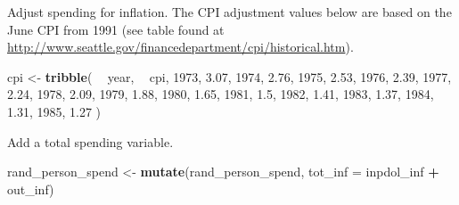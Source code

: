 \documentclass[]{book}
\newenvironment{Shaded}{\begin{snugshade}}{\end{snugshade}}
\newcommand{\DataTypeTok}[1]{\textcolor[rgb]{0.13,0.29,0.53}{#1}}
\newcommand{\DecValTok}[1]{\textcolor[rgb]{0.00,0.00,0.81}{#1}}
\newcommand{\FloatTok}[1]{\textcolor[rgb]{0.00,0.00,0.81}{#1}}
\newcommand{\KeywordTok}[1]{\textcolor[rgb]{0.13,0.29,0.53}{\textbf{#1}}}
\newcommand{\NormalTok}[1]{#1}
\newcommand{\OperatorTok}[1]{\textcolor[rgb]{0.81,0.36,0.00}{\textbf{#1}}}
\newcommand{\StringTok}[1]{\textcolor[rgb]{0.31,0.60,0.02}{#1}}
\theoremstyle{definition}
\theoremstyle{definition}
\theoremstyle{definition}
\theoremstyle{remark}
\begin{document}
Adjust spending for inflation. The CPI adjustment values below are based
on the June CPI from 1991 (see table found at
\url{http://www.seattle.gov/financedepartment/cpi/historical.htm}).

\begin{Shaded}
\begin{Highlighting}[]
\NormalTok{cpi <-}\StringTok{ }\KeywordTok{tribble}\NormalTok{(}
  \OperatorTok{~}\StringTok{ }\NormalTok{year, }\OperatorTok{~}\StringTok{ }\NormalTok{cpi,}
  \DecValTok{1973}\NormalTok{, }\FloatTok{3.07}\NormalTok{,}
  \DecValTok{1974}\NormalTok{, }\FloatTok{2.76}\NormalTok{,}
  \DecValTok{1975}\NormalTok{, }\FloatTok{2.53}\NormalTok{,}
  \DecValTok{1976}\NormalTok{, }\FloatTok{2.39}\NormalTok{,}
  \DecValTok{1977}\NormalTok{, }\FloatTok{2.24}\NormalTok{,}
  \DecValTok{1978}\NormalTok{, }\FloatTok{2.09}\NormalTok{,}
  \DecValTok{1979}\NormalTok{, }\FloatTok{1.88}\NormalTok{,}
  \DecValTok{1980}\NormalTok{, }\FloatTok{1.65}\NormalTok{,}
  \DecValTok{1981}\NormalTok{, }\FloatTok{1.5}\NormalTok{,}
  \DecValTok{1982}\NormalTok{, }\FloatTok{1.41}\NormalTok{,}
  \DecValTok{1983}\NormalTok{, }\FloatTok{1.37}\NormalTok{,}
  \DecValTok{1984}\NormalTok{, }\FloatTok{1.31}\NormalTok{,}
  \DecValTok{1985}\NormalTok{, }\FloatTok{1.27}
\NormalTok{)}
\end{Highlighting}
\end{Shaded}

\begin{Shaded}
\end{Shaded}

Add a total spending variable.

\begin{Shaded}
\begin{Highlighting}[]
\NormalTok{rand_person_spend <-}\StringTok{ }\KeywordTok{mutate}\NormalTok{(rand_person_spend,}
                       \DataTypeTok{tot_inf =}\NormalTok{ inpdol_inf }\OperatorTok{+}\StringTok{ }\NormalTok{out_inf)}
\end{Highlighting}
\end{Shaded}
\end{document}
